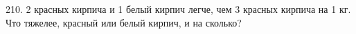 210. 2 красных кирпича и 1 белый кирпич легче, чем 3 красных кирпича на 1 кг. Что тяжелее, красный или белый кирпич, и на сколько?\\
